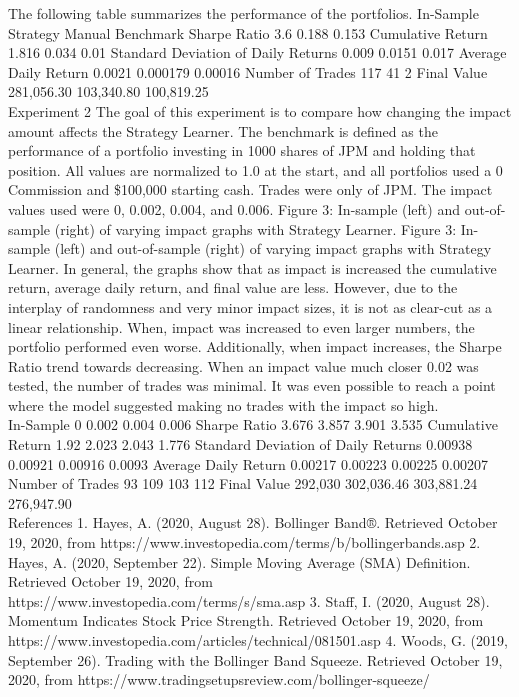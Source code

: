 \documentclass{article}
\begin{document}
The following table summarizes the performance of the portfolios.
In-Sample
Strategy
Manual
Benchmark
Sharpe Ratio
3.6
0.188
0.153
Cumulative Return
1.816
0.034
0.01
Standard Deviation of Daily Returns
0.009
0.0151
0.017
Average Daily Return
0.0021
0.000179
0.00016
Number of Trades
117
41
2
Final Value
281,056.30
103,340.80
100,819.25\\

Experiment 2
The goal of this experiment is to compare how changing the impact amount affects the Strategy Learner. The benchmark is defined as the performance of a portfolio investing in 1000 shares of JPM and holding that position. All values are normalized to 1.0 at the start, and all portfolios used a 0 Commission and \$100,000 starting cash. Trades were only of JPM. The impact values used were 0, 0.002, 0.004, and 0.006.
Figure 3: In-sample (left) and out-of-sample (right) of varying impact graphs with Strategy Learner.
Figure 3: In-sample (left) and out-of-sample (right) of varying impact graphs with Strategy Learner.
In general, the graphs show that as impact is increased the cumulative return, average daily return, and final value are less. However, due to the interplay of randomness and very minor impact sizes, it is not as clear-cut as a linear relationship. When, impact was increased to even larger numbers, the portfolio performed even worse. Additionally, when impact increases, the Sharpe Ratio trend towards decreasing. When an impact value much closer 0.02 was tested, the number of trades was minimal. It was even possible to reach a point where the model suggested making no trades with the impact so high.\\

In-Sample
0
0.002
0.004
0.006
Sharpe Ratio
3.676
3.857
3.901
3.535
Cumulative Return
1.92
2.023
2.043
1.776
Standard Deviation of Daily Returns
0.00938
0.00921
0.00916
0.0093
Average Daily Return
0.00217
0.00223
0.00225
0.00207
Number of Trades
93
109
103
112
Final Value
292,030
302,036.46
303,881.24
276,947.90\\

References
1. Hayes, A. (2020, August 28). Bollinger Band®. Retrieved October 19, 2020, from https://www.investopedia.com/terms/b/bollingerbands.asp 
2. Hayes, A. (2020, September 22). Simple Moving Average (SMA) Definition. Retrieved October 19, 2020, from https://www.investopedia.com/terms/s/sma.asp
3. Staff, I. (2020, August 28). Momentum Indicates Stock Price Strength. Retrieved October 19, 2020, from https://www.investopedia.com/articles/technical/081501.asp
4. Woods, G. (2019, September 26). Trading with the Bollinger Band Squeeze. Retrieved October 19, 2020, from https://www.tradingsetupsreview.com/bollinger-squeeze/\\
\end{document}
